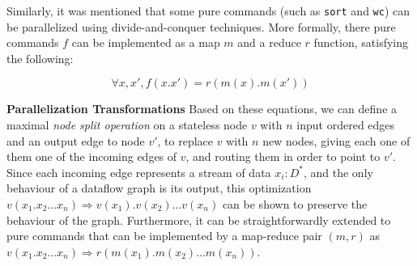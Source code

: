 \documentclass[sigplan,10pt,review,anonymous]{acmart}
\newcommand{\heading}[1]{\vspace{4pt}\noindent\textbf{#1}\enspace}
\newcommand{\ttt}[1]{\texttt{\small #1}}
\newcommand{\tr}[1]{} %
\begin{document}
Similarly, it was mentioned that some pure commands (such as
\ttt{sort} and \ttt{wc}) can be parallelized using divide-and-conquer
techniques. More formally, there pure commands $f$ can be implemented
as a map $m$ and a reduce $r$ function, satisfying the following:

\[
\forall x, x', f(x.x') = r(m(x).m(x'))
\]

\heading{Parallelization Transformations}
%
Based on these equations, we can define a maximal \emph{node split
  operation} on a stateless node $v$ with $n$ input ordered edges and
an output edge to node $v'$, to replace $v$ with $n$ new nodes, giving
each one of them one of the incoming edges of $v$, and routing them in
order to point to $v'$. Since each incoming edge represents a stream
of data $x_i : D^*$, and the only behaviour of a dataflow graph is its
output, this optimization $ v(x_1.x_2...x_n) \Rightarrow
v(x_1).v(x_2)...v(x_n)$ can be shown to preserve the behaviour of the
graph. Furthermore, it can be straightforwardly extended to pure
commands that can be implemented by a map-reduce pair $(m, r)$ as $
v(x_1.x_2...x_n) \Rightarrow r(m(x_1).m(x_2)...m(x_n))$.

\tr{Remember to mention the assumptions that need to hold for the
  graph transformations to be valid in the Command categories
  section. Commands must be deterministic, they must not do any other
  side effect (such as writing to other files, sending signals,
  etc). However, these assumptions must already be checked when the
  developer designates the categories.}

\tr{If there is time I can work out a formal definition and a proof
  sketch why this transformation preserves the output of the dataflow
  graph.}

\end{document}
